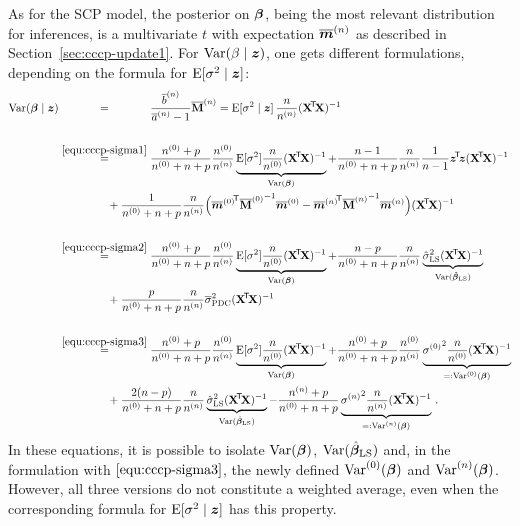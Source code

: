 As for the SCP model, the posterior on $\boldsymbol{\beta}$,
being the most relevant distribution for inferences, is a multivariate $t$
with expectation $\overline{{\bm m}}^{(n)}$ as described in Section~\ref{sec:cccp-update1}.
For $\operatorname{Var}(\beta\mid {\bm z})$, one gets different formulations, depending
on the formula for $\operatorname{E}[\sigma^2\mid {\bm z}]$:
\begin{align}
\V(\bbeta\mid \z)
                   &\stackrel{\phantom{\eqref{equ:cccp-sigma1}}}{=}
  \frac{\tbn}{\tan - 1} \tMn %
     = \E[\sigma^2\mid \z]\, \frac{n}{\nn}(\XtX)^{-1} \label{equ:cccp-varbeta} \\
\nonumber\\
                   &\stackrel{\eqref{equ:cccp-sigma1}}{=}
  \frac{\nz + p}{\nz + n + p} \frac{\nz}{\nn} \underbrace{\E[\sigma^2] \frac{n}{\nz} (\XtX)^{-1}}_{\V(\bbeta)}
    + \frac{n-1}{\nz + n + p}   \frac{n}{\nn} \frac{1}{n-1} \ztz (\XtX)^{-1} \nonumber\\ & \hspace*{10ex}
      + \frac{1}{\nz + n + p}   \frac{n}{\nn} \Big( {\tmz}^\tra {\tMz}^{-1} \tmz
                                                      - {\tmn}^\tra {\tMn}^{-1} \tmn \Big) (\XtX)^{-1} \nonumber\\
\nonumber\\
                   &\stackrel{\eqref{equ:cccp-sigma2}}{=}
  \frac{\nz + p}{\nz + n + p} \frac{\nz}{\nn} \underbrace{\E[\sigma^2] \frac{n}{\nz} (\XtX)^{-1}}_{\V(\bbeta)}
 +\frac{n - p}  {\nz + n + p}   \frac{n}{\nn} \underbrace{\sls (\XtX)^{-1}}_{\V(\bls)} \nonumber\\ & \hspace*{10ex}
 +\frac{p}      {\nz + n + p}   \frac{n}{\nn} \tspdc (\XtX)^{-1} \nonumber\\
\nonumber\\
                   &\stackrel{\eqref{equ:cccp-sigma3}}{=}
  \frac{\nz + p} {\nz + n + p} \frac{\nz}{\nn} \underbrace{\E[\sigma^2] \frac{n}{\nz} (\XtX)^{-1}}_{\V(\bbeta)}
 +\frac{\nz + p} {\nz + n + p} \frac{\nz}{\nn} \underbrace{{\sigma\uz}^2 \frac{n}{\nz} (\XtX)^{-1}}_{=:\V\uz(\bbeta)} \nonumber\\ & \hspace*{10ex}
 +\frac{2(n - p)}{\nz + n + p}   \frac{n}{\nn} \underbrace{\sls (\XtX)^{-1}}_{\V(\bls)}
 -\frac{\nn + p} {\nz + n + p}                 \underbrace{{\sigma\un}^2 \frac{n}{\nn} (\XtX)^{-1}}_{=:\V\un(\bbeta)} \,. \nonumber
\end{align}
In these equations, it is possible to isolate $\operatorname{Var}(\boldsymbol{\beta})$, $\operatorname{Var}(\hat{\boldsymbol{\beta}}_\text{LS})$ and,
in the formulation with $\eqref{equ:cccp-sigma3}$, the newly defined
$\operatorname{Var}^{(0)}(\boldsymbol{\beta})$ and $\operatorname{Var}^{(n)}(\boldsymbol{\beta})$.
However, all three versions do not constitute a weighted average,
even when the corresponding formula for $\operatorname{E}[\sigma^2\mid {\bm z}]$ has this property.

